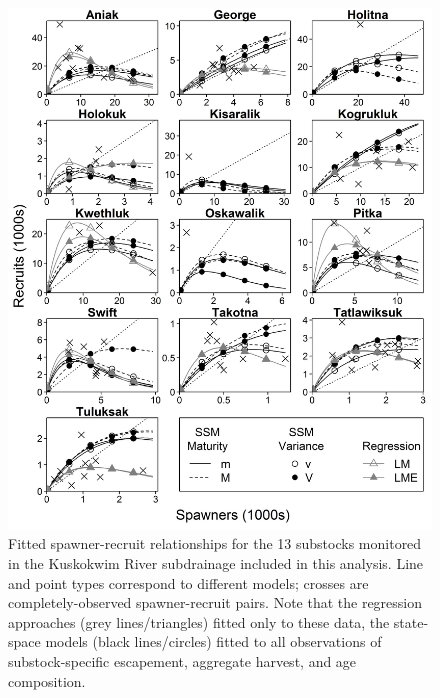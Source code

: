 \documentclass[12pt,]{book}
\theoremstyle{definition}
\theoremstyle{definition}
\theoremstyle{definition}
\theoremstyle{remark}
\begin{document}
\begin{figure}
  \centering
  \includegraphics{img/Ch4/R-v-S.jpg}
  \caption{Fitted spawner-recruit relationships for the 13 substocks monitored in the Kuskokwim River subdrainage included in this analysis. Line and point types correspond to different models; crosses are completely-observed spawner-recruit pairs. Note that the regression approaches (grey lines/triangles) fitted only to these data, the state-space models (black lines/circles) fitted to all observations of substock-specific escapement, aggregate harvest, and age composition.}
  \label{fig:r-v-s}
\end{figure}

\clearpage
\end{document}
